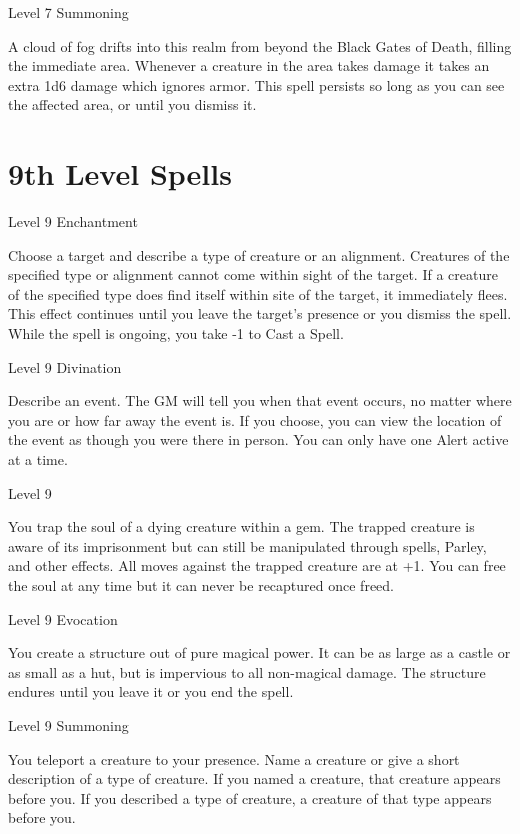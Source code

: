  
\startSpellName
{} 	Level 7	Summoning
\stopSpellName
 

A cloud of fog drifts into this realm from beyond the Black Gates of Death, filling the immediate area. Whenever a creature in the area takes damage it takes an extra 1d6 damage which ignores armor. This spell persists so long as you can see the affected area, or until you dismiss it.



 


\section{9th Level Spells}     
 
\startSpellName
{} 	Level 9	Enchantment
\stopSpellName
 

Choose a target and describe a type of creature or an alignment. Creatures of the specified type or alignment cannot come within sight of the target. If a creature of the specified type does find itself within site of the target, it immediately flees. This effect continues until you leave the target's presence or you dismiss the spell. While the spell is ongoing, you take -1 to Cast a Spell.

 
\startSpellName
{} 	Level 9	Divination
\stopSpellName
 

Describe an event. The GM will tell you when that event occurs, no matter where you are or how far away the event is. If you choose, you can view the location of the event as though you were there in person. You can only have one Alert active at a time.

 
\startSpellName
{} 	Level 9
\stopSpellName
 

You trap the soul of a dying creature within a gem. The trapped creature is aware of its imprisonment but can still be manipulated through spells, Parley, and other effects. All moves against the trapped creature are at +1. You can free the soul at any time but it can never be recaptured once freed.

 
\startSpellName
{} 	Level 9	Evocation
\stopSpellName
 

You create a structure out of pure magical power. It can be as large as a castle or as small as a hut, but is impervious to all non-magical damage. The structure endures until you leave it or you end the spell.

 
\startSpellName
{} 	Level 9	Summoning
\stopSpellName
 

You teleport a creature to your presence. Name a creature or give a short description of a type of creature. If you named a creature, that creature appears before you. If you described a type of creature, a creature of that type appears before you.









